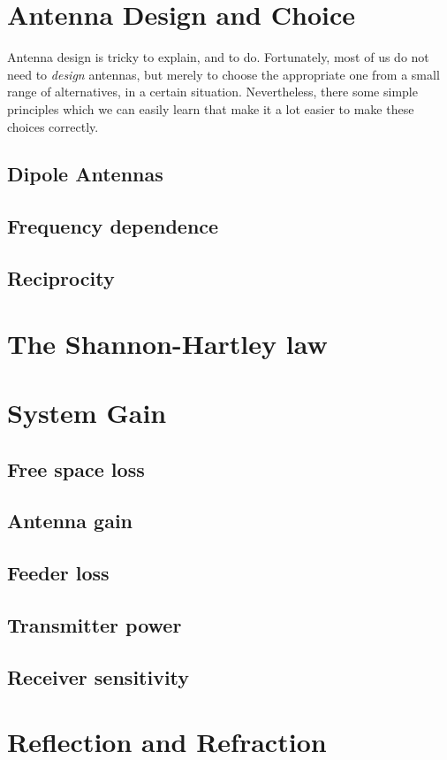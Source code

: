 \section{Antenna Design and Choice}

Antenna design is tricky to explain, and to do. Fortunately,
most of us do not need to {\em design} antennas, but merely to
choose the appropriate one from a small range of alternatives, in
a certain situation. Nevertheless, there some simple principles
which we can easily learn that make it a lot easier to make these
choices correctly.

\subsection{Dipole Antennas}

\subsection{Frequency dependence}

\subsection{Reciprocity}



\section{The Shannon-Hartley law}

\section{System Gain}

\subsection{Free space loss}

\subsection{Antenna gain}

\subsection{Feeder loss}

\subsection{Transmitter power}

\subsection{Receiver sensitivity}


\section{Reflection and Refraction}


